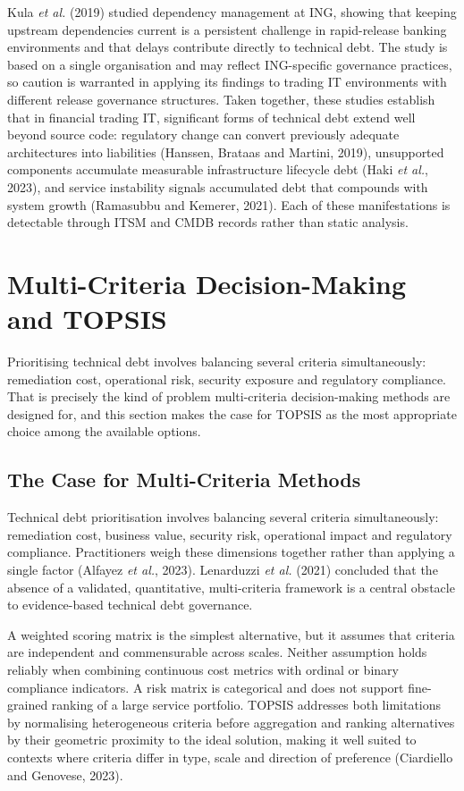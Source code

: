 \documentclass[
  12pt,
  letterpaper,
  12pt,
  oneside,
  english,
  onehalfspacing,
  headsepline]{MastersDoctoralThesis}
\begin{document}
Kula \emph{et al.} (2019) studied dependency management at ING, showing
that keeping upstream dependencies current is a persistent challenge in
rapid-release banking environments and that delays contribute directly
to technical debt. The study is based on a single organisation and may
reflect ING-specific governance practices, so caution is warranted in
applying its findings to trading IT environments with different release
governance structures. Taken together, these studies establish that in
financial trading IT, significant forms of technical debt extend well
beyond source code: regulatory change can convert previously adequate
architectures into liabilities (Hanssen, Brataas and Martini, 2019),
unsupported components accumulate measurable infrastructure lifecycle
debt (Haki \emph{et al.}, 2023), and service instability signals
accumulated debt that compounds with system growth (Ramasubbu and
Kemerer, 2021). Each of these manifestations is detectable through ITSM
and CMDB records rather than static analysis.

\section{Multi-Criteria Decision-Making and
TOPSIS}\label{multi-criteria-decision-making-and-topsis}

Prioritising technical debt involves balancing several criteria
simultaneously: remediation cost, operational risk, security exposure
and regulatory compliance. That is precisely the kind of problem
multi-criteria decision-making methods are designed for, and this
section makes the case for TOPSIS as the most appropriate choice among
the available options.

\subsection{The Case for Multi-Criteria
Methods}\label{the-case-for-multi-criteria-methods}

Technical debt prioritisation involves balancing several criteria
simultaneously: remediation cost, business value, security risk,
operational impact and regulatory compliance. Practitioners weigh these
dimensions together rather than applying a single factor (Alfayez
\emph{et al.}, 2023). Lenarduzzi \emph{et al.} (2021) concluded that the
absence of a validated, quantitative, multi-criteria framework is a
central obstacle to evidence-based technical debt governance.

A weighted scoring matrix is the simplest alternative, but it assumes
that criteria are independent and commensurable across scales. Neither
assumption holds reliably when combining continuous cost metrics with
ordinal or binary compliance indicators. A risk matrix is categorical
and does not support fine-grained ranking of a large service portfolio.
TOPSIS addresses both limitations by normalising heterogeneous criteria
before aggregation and ranking alternatives by their geometric proximity
to the ideal solution, making it well suited to contexts where criteria
differ in type, scale and direction of preference (Ciardiello and
Genovese, 2023).
\end{document}
